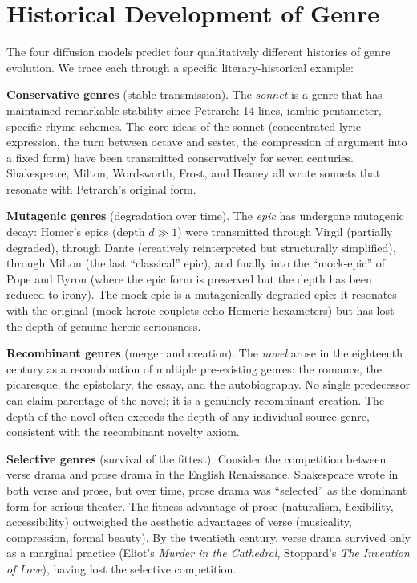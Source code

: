 \documentclass[11pt,openany]{book}
\theoremstyle{definition}
\theoremstyle{plain}
\theoremstyle{remark}
\begin{document}
\section{Historical Development of Genre}

The four diffusion models predict four qualitatively different histories of genre evolution. We trace each through a specific literary-historical example:

\textbf{Conservative genres} (stable transmission). The \emph{sonnet} is a genre that has maintained remarkable stability since Petrarch: 14 lines, iambic pentameter, specific rhyme schemes. The core ideas of the sonnet (concentrated lyric expression, the turn between octave and sestet, the compression of argument into a fixed form) have been transmitted conservatively for seven centuries. Shakespeare, Milton, Wordsworth, Frost, and Heaney all wrote sonnets that resonate with Petrarch's original form.

\textbf{Mutagenic genres} (degradation over time). The \emph{epic} has undergone mutagenic decay: Homer's epics (depth $d \gg 1$) were transmitted through Virgil (partially degraded), through Dante (creatively reinterpreted but structurally simplified), through Milton (the last ``classical'' epic), and finally into the ``mock-epic'' of Pope and Byron (where the epic form is preserved but the depth has been reduced to irony). The mock-epic is a mutagenically degraded epic: it resonates with the original (mock-heroic couplets echo Homeric hexameters) but has lost the depth of genuine heroic seriousness.

\textbf{Recombinant genres} (merger and creation). The \emph{novel} arose in the eighteenth century as a recombination of multiple pre-existing genres: the romance, the picaresque, the epistolary, the essay, and the autobiography. No single predecessor can claim parentage of the novel; it is a genuinely recombinant creation. The depth of the novel often exceeds the depth of any individual source genre, consistent with the recombinant novelty axiom.

\textbf{Selective genres} (survival of the fittest). Consider the competition between verse drama and prose drama in the English Renaissance. Shakespeare wrote in both verse and prose, but over time, prose drama was ``selected'' as the dominant form for serious theater. The fitness advantage of prose (naturalism, flexibility, accessibility) outweighed the aesthetic advantages of verse (musicality, compression, formal beauty). By the twentieth century, verse drama survived only as a marginal practice (Eliot's \emph{Murder in the Cathedral}, Stoppard's \emph{The Invention of Love}), having lost the selective competition.
\end{document}
